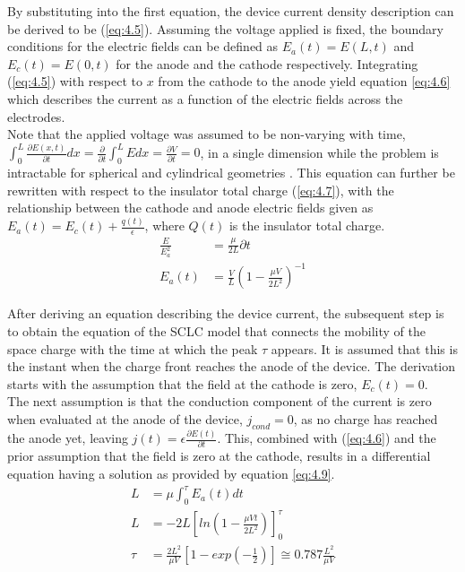 \noindent By substituting into the first equation, the device current density description can be derived to be (\ref{eq:4.5}). Assuming the voltage applied is fixed, the boundary conditions for the electric fields can be defined as $E_a(t) = E(L,t)$ and $E_c(t) = E(0,t)$ for the anode and the cathode respectively. Integrating (\ref{eq:4.5}) with respect to $x$ from the cathode to the anode yield equation \ref{eq:4.6} which describes the current as a function of the electric fields across the electrodes. \\


\noindent Note that the applied voltage was assumed to be non-varying with time, $\int_{0}^{L} \frac{\partial E(x,t)}{\partial t} dx = \frac{\partial }{\partial t} \int_{0}^{L}Edx = \frac{\partial V}{\partial t} = 0$, in a single dimension while the problem is intractable for spherical and cylindrical geometries \cite{lampert1970current}. This equation can further be rewritten with respect to the insulator total charge (\ref{eq:4.7}), with the relationship between the cathode and anode electric fields given as $E_a(t) = E_c(t) + \frac{q(t)}{\epsilon}$, where $Q(t)$ is the insulator total charge.
\begin{align}
\frac{E}{E_a^2} &= \frac{\mu}{2L} \partial t \label{eq:4.8} \\
E_a(t) &= \frac{V}{L}\left( 1 - \frac{\mu V}{2L^2} \right)^{-1} \label{eq:4.9}
\end{align}

\noindent After deriving an equation describing the device current, the subsequent step is to obtain the equation of the SCLC model that connects the mobility of the space charge with the time at which the peak $\tau$ appears. It is assumed that this is the instant when the charge front reaches the anode of the device. The derivation starts with the assumption that the field at the cathode is zero, $E_c(t) = 0$. \\

\noindent The next assumption is that the conduction component of the current is zero when evaluated at the anode of the device, $j_{cond} = 0$, as no charge has reached the anode yet, leaving $j(t)=\epsilon  \frac{\partial E(t)}{\partial t}$. This, combined with (\ref{eq:4.6}) and the prior assumption that the field is zero at the cathode, results in a differential equation having a solution as provided by equation \ref{eq:4.9}. 
\begin{align}
L &= \mu \int_{0}^{\tau} E_a(t) dt \label{eq:4.10} \\
L &= -2L \left[ ln \left( 1 - \frac{\mu V t}{2L^2} \right) \right]_0^{\tau} \label{eq:4.11} \\
\tau &= \frac{2 L^2}{\mu V} \left[ 1 - exp \left( -\frac{1}{2} \right) \right] \cong 0.787 \frac{L^2}{\mu V} \label{eq:4.12} 
\end{align}


